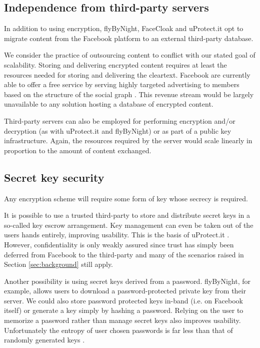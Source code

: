 \FloatBarrier
\subsection{Independence from third-party servers}

In addition to using encryption, flyByNight, FaceCloak and uProtect.it opt to migrate content from the Facebook platform to an external third-party database.

We consider the practice of outsourcing content to conflict with our stated goal of scalability. Storing and delivering encrypted content requires at least the resources needed for storing and delivering the cleartext. Facebook are currently able to offer a free service by serving highly targeted advertising to members based on the structure of the social graph \cite{fb-ads}. This revenue stream would be largely unavailable to any solution hosting a database of encrypted content.

Third-party servers can also be employed for performing encryption and/or decryption (as with uProtect.it and flyByNight) or as part of a public key infrastructure. Again, the resources required by the server would scale linearly in proportion to the amount of content exchanged.


\FloatBarrier
\subsection{Secret key security}

Any encryption scheme will require some form of key whose secrecy is required.

It is possible to use a trusted third-party to store and distribute secret keys in a so-called key escrow arrangement. Key management can even be taken out of the users hands entirely, improving usability. This is the basis of uProtect.it \cite{uprotect}. However, confidentiality is only weakly assured since trust has simply been deferred from Facebook to the third-party and many of the scenarios raised in Section \ref{sec:background} still apply.

Another possibility is using secret keys derived from a password. flyByNight, for example, allows users to download a password-protected private key from their server. We could also store password protected keys in-band (i.e. on Facebook itself) or generate a key simply by hashing a password. Relying on the user to memorize a password rather than manage secret keys also improves usability. Unfortunately the entropy of user chosen passwords is far less than that of randomly generated keys \cite{passwords}.

